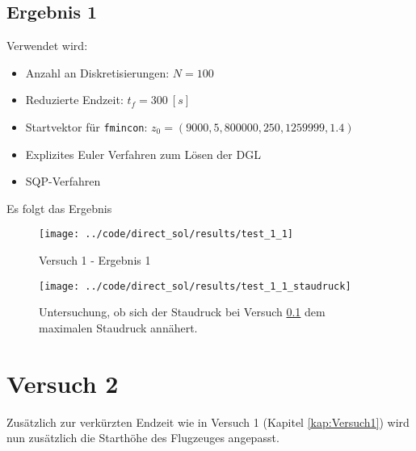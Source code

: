 \subsection{Ergebnis 1}\label{kap:Versuch11}
Verwendet wird:
\begin{itemize}
\item Anzahl an Diskretisierungen: $N = 100$ 
\item Reduzierte Endzeit: $t_f = 300 \ [s]$
\item Startvektor für \texttt{fmincon}: $z_0 = (9000,5,800000,250,1259999,1.4)$
\item Explizites Euler Verfahren zum Lösen der DGL
%
\item SQP-Verfahren
\end{itemize}
Es folgt das Ergebnis
\begin{figure}[H]
\begin{center}
\texttt{[image: ../code/direct\_sol/results/test\_1\_1]}
\caption{Versuch 1 - Ergebnis 1}\label{img:test_1_1}
\end{center}
\end{figure}

\begin{figure}[H]
\begin{center}
\texttt{[image: ../code/direct\_sol/results/test\_1\_1\_staudruck]}
\caption{Untersuchung, ob sich der Staudruck bei Versuch \ref{kap:Versuch11} dem maximalen Staudruck annähert.}\label{img:test_1_1_staudruck}
\end{center}
\end{figure}

















\section{Versuch 2}\label{kap:Versuch2}
Zusätzlich zur verkürzten Endzeit wie in Versuch 1 (Kapitel \ref{kap:Versuch1}) wird nun zusätzlich die Starthöhe des Flugzeuges angepasst.

